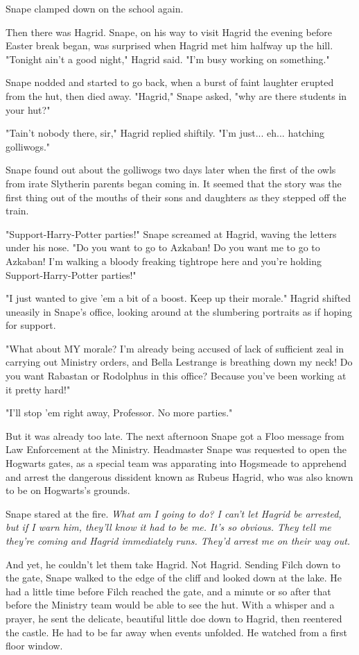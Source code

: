 \documentclass[a4paper,11pt]{article}
\begin{document}
Snape clamped down on the school again.

Then there was Hagrid. Snape, on his way to visit Hagrid the evening before Easter break began, was surprised when Hagrid met him halfway up the hill. "Tonight ain't a good night," Hagrid said. "I'm busy working on something."

Snape nodded and started to go back, when a burst of faint laughter erupted from the hut, then died away. "Hagrid," Snape asked, "why are there students in your hut?"

"Tain't nobody there, sir," Hagrid replied shiftily. "I'm just... eh... hatching golliwogs."

Snape found out about the golliwogs two days later when the first of the owls from irate Slytherin parents began coming in. It seemed that the story was the first thing out of the mouths of their sons and daughters as they stepped off the train.

"Support-Harry-Potter parties!" Snape screamed at Hagrid, waving the letters under his nose. "Do you want to go to Azkaban! Do you want me to go to Azkaban! I'm walking a bloody freaking tightrope here and you're holding Support-Harry-Potter parties!"

"I just wanted to give 'em a bit of a boost. Keep up their morale." Hagrid shifted uneasily in Snape's office, looking around at the slumbering portraits as if hoping for support.

"What about MY morale? I'm already being accused of lack of sufficient zeal in carrying out Ministry orders, and Bella Lestrange is breathing down my neck! Do you want Rabastan or Rodolphus in this office? Because you've been working at it pretty hard!"

"I'll stop 'em right away, Professor. No more parties."

But it was already too late. The next afternoon Snape got a Floo message from Law Enforcement at the Ministry. Headmaster Snape was requested to open the Hogwarts gates, as a special team was apparating into Hogsmeade to apprehend and arrest the dangerous dissident known as Rubeus Hagrid, who was also known to be on Hogwarts's grounds.

Snape stared at the fire. \emph{What am I going to do? I can't let Hagrid be arrested, but if I warn him, they'll know it had to be me. It's so obvious. They tell me they're coming and Hagrid immediately runs. They'd arrest me on their way out.}

And yet, he couldn't let them take Hagrid. Not Hagrid. Sending Filch down to the gate, Snape walked to the edge of the cliff and looked down at the lake. He had a little time before Filch reached the gate, and a minute or so after that before the Ministry team would be able to see the hut. With a whisper and a prayer, he sent the delicate, beautiful little doe down to Hagrid, then reentered the castle. He had to be far away when events unfolded. He watched from a first floor window.
\end{document}
